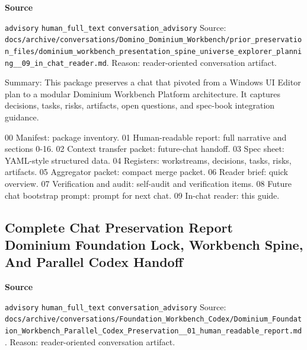 \documentclass[9pt,a4paper,openany]{book}
\newcommand{\vonecallout}[3]{\par\medskip\noindent\begingroup\setlength{\fboxsep}{7pt}\colorbox{DomCalloutBg}{\parbox{0.94\linewidth}{\textbf{\textcolor{#1}{#2}}\par #3}}\endgroup\par\medskip}
\begin{document}
\vonecallout{DomSlate}{Source}{\texttt{advisory} \texttt{human\_\allowbreak{}full\_\allowbreak{}text} \texttt{conversation\_\allowbreak{}advisory} Source: \texttt{docs/\allowbreak{}archive/\allowbreak{}conversations/\allowbreak{}Domino\_\allowbreak{}Dominium\_\allowbreak{}Workbench/\allowbreak{}prior\_\allowbreak{}preservation\_\allowbreak{}files/\allowbreak{}dominium\_\allowbreak{}workbench\_\allowbreak{}presentation\_\allowbreak{}spine\_\allowbreak{}universe\_\allowbreak{}explorer\_\allowbreak{}planning\_\allowbreak{}\_\allowbreak{}09\_\allowbreak{}in\_\allowbreak{}chat\_\allowbreak{}reader.\allowbreak{}md}.\allowbreak{} Reason: reader-\allowbreak{}oriented conversation artifact.\allowbreak{}}

Summary: This package preserves a chat that pivoted from a Windows UI Editor plan to a modular Dominium Workbench Platform architecture.\allowbreak{} It captures decisions, tasks, risks, artifacts, open questions, and spec-\allowbreak{}book integration guidance.\allowbreak{}


00 Manifest: package inventory.\allowbreak{} 01 Human-\allowbreak{}readable report: full narrative and sections 0-\allowbreak{}16.\allowbreak{} 02 Context transfer packet: future-\allowbreak{}chat handoff.\allowbreak{} 03 Spec sheet: YAML-\allowbreak{}style structured data.\allowbreak{} 04 Registers: workstreams, decisions, tasks, risks, artifacts.\allowbreak{} 05 Aggregator packet: compact merge packet.\allowbreak{} 06 Reader brief: quick overview.\allowbreak{} 07 Verification and audit: self-\allowbreak{}audit and verification items.\allowbreak{} 08 Future chat bootstrap prompt: prompt for next chat.\allowbreak{} 09 In-\allowbreak{}chat reader: this guide.\allowbreak{}



\subsection{Complete Chat Preservation Report Dominium Foundation Lock, Workbench Spine, And Parallel Codex Handoff}

\vonecallout{DomSlate}{Source}{\texttt{advisory} \texttt{human\_\allowbreak{}full\_\allowbreak{}text} \texttt{conversation\_\allowbreak{}advisory} Source: \texttt{docs/\allowbreak{}archive/\allowbreak{}conversations/\allowbreak{}Foundation\_\allowbreak{}Workbench\_\allowbreak{}Codex/\allowbreak{}Dominium\_\allowbreak{}Foundation\_\allowbreak{}Workbench\_\allowbreak{}Parallel\_\allowbreak{}Codex\_\allowbreak{}Preservation\_\allowbreak{}\_\allowbreak{}01\_\allowbreak{}human\_\allowbreak{}readable\_\allowbreak{}report.\allowbreak{}md}.\allowbreak{} Reason: reader-\allowbreak{}oriented conversation artifact.\allowbreak{}}
\end{document}
